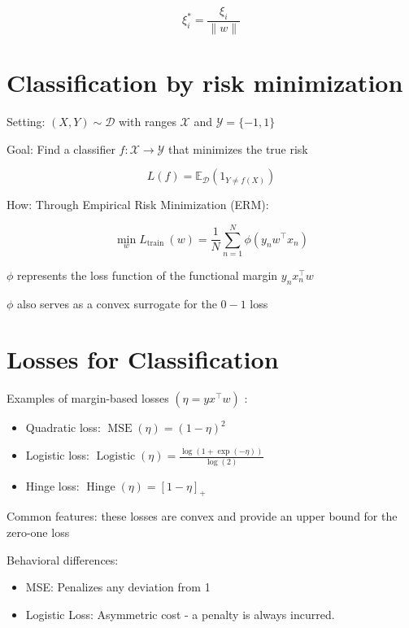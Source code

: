 \documentclass[10pt]{article}
\begin{document}
$$
\xi_{i}^{*}=\frac{\xi_{i}}{\|w\|}
$$

\section*{Classification by risk minimization}
Setting: $(X, Y) \sim \mathscr{D}$ with ranges $\mathscr{X}$ and $\mathscr{Y}=\{-1,1\}$

Goal: Find a classifier $f: \mathscr{X} \rightarrow \mathcal{Y}$ that minimizes the true risk

$$
L(f)=\mathbb{E}_{\mathscr{D}}\left(1_{Y \neq f(X)}\right)
$$

How: Through Empirical Risk Minimization (ERM):

$$
\min _{w} L_{\text {train }}(w)=\frac{1}{N} \sum_{n=1}^{N} \phi\left(y_{n} w^{\top} x_{n}\right)
$$

$\phi$ represents the loss function of the functional margin $y_{n} x_{n}^{\top} w$

$\phi$ also serves as a convex surrogate for the $0-1$ loss

\section*{Losses for Classification}
Examples of margin-based losses $\left(\eta=y x^{\top} w\right)$ :

\begin{itemize}
  \item Quadratic loss: $\operatorname{MSE}(\eta)=(1-\eta)^{2}$
  \item Logistic loss: $\operatorname{Logistic}(\eta)=\frac{\log (1+\exp (-\eta))}{\log (2)}$
  \item Hinge loss: $\operatorname{Hinge}(\eta)=[1-\eta]_{+}$
\end{itemize}

Common features: these losses are convex and provide an upper bound for the zero-one loss

Behavioral differences:

\begin{itemize}
  \item MSE: Penalizes any deviation from 1
  \item Logistic Loss: Asymmetric cost - a penalty is always incurred.
\end{itemize}
\end{document}
